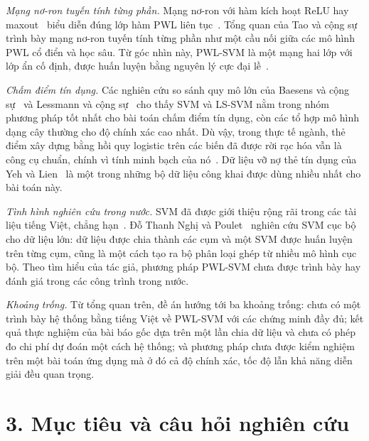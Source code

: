 \emph{Mạng nơ-ron tuyến tính từng phần.} Mạng nơ-ron với hàm kích hoạt ReLU hay maxout~\cite{goodfellow2013} biểu diễn đúng lớp hàm PWL liên tục~\cite{arora2018}. Tổng quan của Tao và cộng sự~\cite{tao2022} trình bày mạng nơ-ron tuyến tính từng phần như một cầu nối giữa các mô hình PWL cổ điển và học sâu. Từ góc nhìn này, PWL-SVM là một mạng hai lớp với lớp ẩn cố định, được huấn luyện bằng nguyên lý cực đại lề~\cite{suykens1999mlp}.

\emph{Chấm điểm tín dụng.} Các nghiên cứu so sánh quy mô lớn của Baesens và cộng sự~\cite{baesens2003} và Lessmann và cộng sự~\cite{lessmann2015} cho thấy SVM và LS-SVM nằm trong nhóm phương pháp tốt nhất cho bài toán chấm điểm tín dụng, còn các tổ hợp mô hình dạng cây thường cho độ chính xác cao nhất. Dù vậy, trong thực tế ngành, thẻ điểm xây dựng bằng hồi quy logistic trên các biến đã được rời rạc hóa vẫn là công cụ chuẩn, chính vì tính minh bạch của nó~\cite{thomas2002}. Dữ liệu vỡ nợ thẻ tín dụng của Yeh và Lien~\cite{yeh2009} là một trong những bộ dữ liệu công khai được dùng nhiều nhất cho bài toán này.

\emph{Tình hình nghiên cứu trong nước.} SVM đã được giới thiệu rộng rãi trong các tài liệu tiếng Việt, chẳng hạn~\cite{vuhuutiep2018}. Đỗ Thanh Nghị và Poulet~\cite{do2017} nghiên cứu SVM cục bộ cho dữ liệu lớn: dữ liệu được chia thành các cụm và một SVM được huấn luyện trên từng cụm, cũng là một cách tạo ra bộ phân loại ghép từ nhiều mô hình cục bộ. Theo tìm hiểu của tác giả, phương pháp PWL-SVM chưa được trình bày hay đánh giá trong các công trình trong nước.

\emph{Khoảng trống.} Từ tổng quan trên, đề án hướng tới ba khoảng trống: chưa có một trình bày hệ thống bằng tiếng Việt về PWL-SVM với các chứng minh đầy đủ; kết quả thực nghiệm của bài báo gốc dựa trên một lần chia dữ liệu và chưa có phép đo chi phí dự đoán một cách hệ thống; và phương pháp chưa được kiểm nghiệm trên một bài toán ứng dụng mà ở đó cả độ chính xác, tốc độ lẫn khả năng diễn giải đều quan trọng.

\section*{3. Mục tiêu và câu hỏi nghiên cứu}

